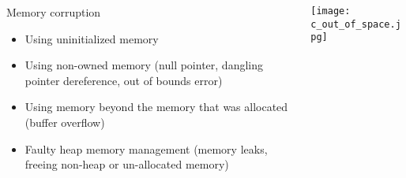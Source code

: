 \begin{frame}{\insertsubsection}

  \begin{columns}
    \begin{column}{0.6\textwidth}
    Memory corruption
    \begin{itemize}
    \item Using uninitialized memory
    \item Using non-owned memory (null pointer, dangling pointer dereference,
      out of bounds error)
    \item Using memory beyond the memory that was allocated (buffer overflow)
    \item Faulty heap memory management (memory leaks, freeing non-heap or
      un-allocated memory)
    \end{itemize}
  \end{column}
  \begin{column}{0.4\textwidth}
    \texttt{[image: c\_out\_of\_space.jpg]}
  \end{column}
\end{columns}

\end{frame}
